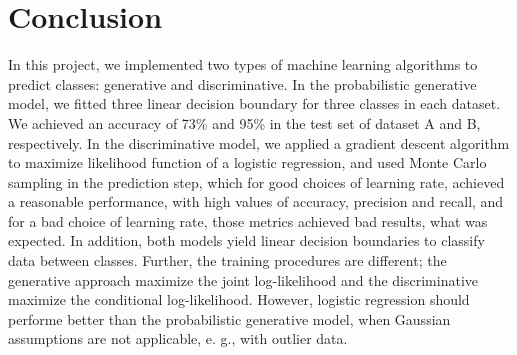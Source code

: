 \documentclass{article}
\begin{document}
\section{Conclusion}

In this project, we implemented two types of machine learning algorithms to predict classes: generative and discriminative. In the probabilistic generative model, we fitted three linear decision boundary for three classes in each dataset. We achieved an accuracy of 73\% and 95\% in the test set of dataset A and B, respectively. In the discriminative model, we applied a gradient descent algorithm to maximize likelihood function of a logistic regression, and used Monte Carlo sampling in the prediction step, which for good choices of learning rate, achieved a reasonable performance, with high values of accuracy, precision and recall, and for a bad choice of learning rate, those metrics achieved bad results, what was expected. In addition, both models yield linear decision boundaries to classify data between classes. Further, the training procedures are different; the generative approach maximize the joint log-likelihood and the discriminative maximize the conditional log-likelihood. However, logistic regression should performe better than the probabilistic generative model, when Gaussian assumptions are not applicable, e. g., with outlier data.

\printbibliography
\end{document}
